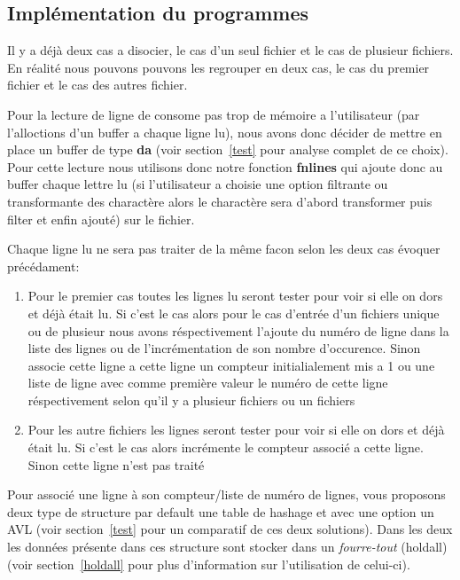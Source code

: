 \documentclass[12pt]{article}
\begin{document}
    \subsection{Implémentation du programmes}
    Il y a déjà deux cas a disocier, le cas d'un seul fichier et le cas de 
    plusieur fichiers. En réalité nous pouvons pouvons les regrouper en deux 
    cas, le cas du premier fichier et le cas des autres fichier.

    Pour la lecture de ligne de consome pas trop de mémoire a l'utilisateur
    (par l'alloctions d'un buffer a chaque ligne lu), nous avons donc décider de 
    mettre en place un buffer de type \textbf{da} (voir section~\ref{test} pour
    analyse complet de ce choix). Pour cette lecture nous utilisons donc notre
    fonction \textbf{fnlines} qui ajoute donc au buffer chaque lettre lu (si 
    l'utilisateur a choisie une option filtrante ou transformante des charactère 
    alors le charactère sera d'abord transformer puis filter et enfin ajouté) 
    sur le fichier.

    Chaque ligne lu ne sera pas traiter de la même facon selon les deux cas 
    évoquer précédament:
    \begin{enumerate}
        \item[] Pour le premier cas toutes les lignes lu seront tester pour 
        voir si elle on dors et déjà était lu. Si c'est le cas alors pour le 
        cas d'entrée d'un fichiers unique ou de plusieur nous avons 
        réspectivement l'ajoute du numéro de ligne dans la liste des lignes ou 
        de l'incrémentation de son nombre d'occurence. Sinon associe cette ligne 
        a cette ligne un compteur initialialement mis a 1 ou une liste de ligne 
        avec comme première valeur le numéro de cette ligne réspectivement selon 
        qu'il y a plusieur fichiers ou un fichiers
        \item[] Pour les autre fichiers les lignes seront tester pour voir si 
        elle on dors et déjà était lu. Si c'est le cas alors incrémente le 
        compteur associé a cette ligne. Sinon cette ligne n'est pas traité
    \end{enumerate}

    Pour associé une ligne à son compteur/liste de numéro de lignes, vous 
    proposons deux type de structure par default une table de hashage et avec 
    une option un AVL (voir section~\ref{test} pour un comparatif de ces deux 
    solutions). Dans les deux les données présente dans ces structure sont 
    stocker dans un \textit{fourre-tout} (holdall) (voir section~\ref{holdall} 
    pour plus d'information sur l'utilisation de celui-ci).
\end{document}
